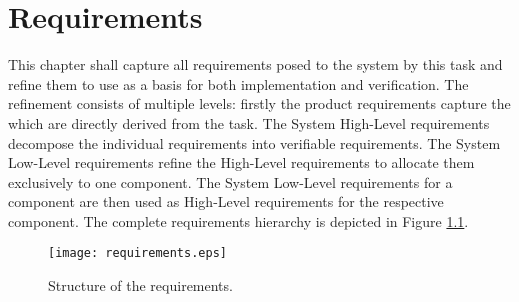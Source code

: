 \chapter{Requirements}
This chapter shall capture all requirements posed to the
system by this task and refine them to use as a basis for
both implementation and verification.
The refinement consists of multiple levels:
firstly the product requirements capture the which are directly
derived from the task. The System High-Level requirements
decompose the individual requirements into verifiable
requirements. The System Low-Level requirements refine the 
High-Level requirements to allocate them exclusively to one
component. The System Low-Level requirements for a component
are then used as High-Level requirements for the respective
component. The complete requirements hierarchy is depicted
in Figure \ref{fig:reqStructure}.

\begin{figure}[H]
    \centering
    \texttt{[image: requirements.eps]}
    \caption{Structure of the requirements.} 
    \label{fig:reqStructure}
\end{figure}


